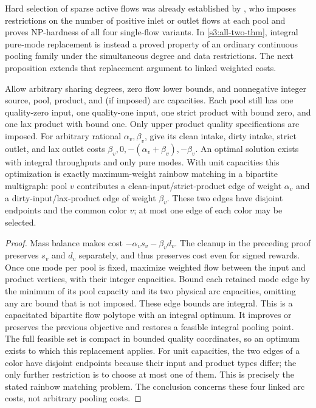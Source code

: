 Hard selection of sparse active flows was already established by
\citet[Definition~2.2 and Proposition~3.1, p.~96]{s3:haugland2019-single-flow},
who imposes restrictions on the number of positive inlet or outlet flows
at each pool and proves NP-hardness of all four single-flow variants.
In \cref{s3:all-two-thm}, integral pure-mode replacement is instead a
proved property of an ordinary continuous pooling family under the
simultaneous degree and data restrictions. The next proposition extends
that replacement argument to linked weighted costs.

\begin{proposition}\label{s3:weighted}
Allow arbitrary sharing degrees, zero flow lower bounds, and nonnegative
integer source, pool, product, and (if imposed) arc capacities. Each pool
still has one quality-zero input, one
quality-one input, one strict product with bound zero, and one lax product
with bound one. Only upper product quality specifications are imposed.
For arbitrary rational $\alpha_v,\beta_v$, give its clean
intake, dirty intake, strict outlet, and lax outlet costs
$\beta_v,0,-(\alpha_v+\beta_v),-\beta_v$. An optimal solution exists
with integral throughputs and only pure modes. With unit capacities
this optimization is exactly maximum-weight rainbow matching in a
bipartite multigraph: pool $v$ contributes a clean-input/strict-product
edge of weight $\alpha_v$ and a dirty-input/lax-product edge of weight
$\beta_v$. These two edges have disjoint endpoints and the common color
$v$; at most one edge of each color may be selected.
\end{proposition}
\begin{proof}
Mass balance makes cost $-\alpha_vs_v-\beta_vd_v$. The cleanup in the
preceding proof preserves $s_v$ and $d_v$ separately, and thus preserves
cost even for signed rewards. Once one mode per pool is fixed, maximize
weighted flow between the input and product vertices, with their integer
capacities. Bound each retained mode edge by the minimum of its pool
capacity and its two physical arc capacities, omitting any arc bound
that is not imposed. These edge bounds are integral. This is a capacitated
bipartite flow polytope with an integral optimum. It improves or preserves
the previous objective and restores a feasible integral pooling point.
The full feasible set is compact in bounded quality coordinates, so an
optimum exists to which this replacement applies. For unit capacities,
the two edges of a color have disjoint endpoints because their input and
product types differ; the only further restriction is to choose at most
one of them. This is precisely the stated rainbow matching problem.
The conclusion concerns these four linked arc costs, not arbitrary
pooling costs.
\end{proof}

